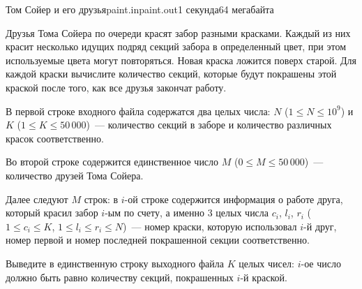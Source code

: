 \begin{problem}{Том Сойер и его друзья}{paint.in}{paint.out}{1 секунда}{64 мегабайта}

Друзья Тома Сойера по очереди красят забор разными красками. Каждый из них красит несколько идущих подряд секций забора
в определенный цвет, при этом используемые цвета могут повторяться. Новая краска ложится поверх старой.
Для каждой краски вычислите количество секций, которые будут покрашены этой краской после того, как все
друзья закончат работу.

\InputFile

В первой строке входного файла содержатся два целых числа: $N$ ($1 \le N \le 10^9$) и $K$ ($1 \le K \le 50\,000$)~---
количество секций в заборе и количество различных красок соответственно.

Во второй строке содержится единственное число $M$ ($0 \le M \le 50\,000$)~--- количество друзей Тома Сойера.

Далее следуют $M$ строк: в $i$-ой строке содержится информация о работе друга, который красил забор $i$-ым 
по счету, а именно 3 целых числа $c_i$, $l_i$, $r_i$ ($1 \le c_i \le K$, $1 \le l_i \le r_i \le N$)~---
номер краски, которую использовал $i$-й друг, номер первой и номер последней покрашенной секции соответственно.

\OutputFile

Выведите в единственную строку выходного файла $K$ целых чисел: $i$-ое число должно быть равно количеству секций, покрашенных $i$-й
краской.

\Example                

\begin{example}
%
%
\end{example}

\end{problem}

